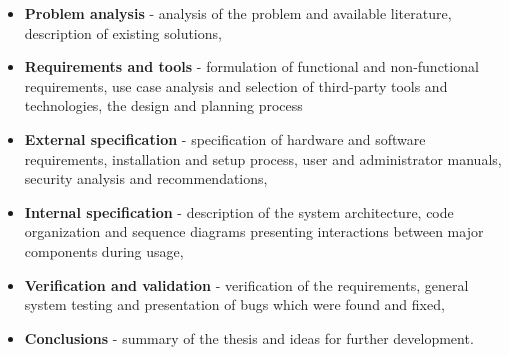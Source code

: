 \begin{itemize}
	\item \textbf{Problem analysis} - analysis of the problem and available literature, description of existing solutions,
	\item \textbf{Requirements and tools} - formulation of functional and non-functional requirements, use case analysis and selection of third-party tools and technologies, the design and planning process
	\item \textbf{External specification} - specification of hardware and software requirements, installation and setup process, user and administrator manuals, security analysis and recommendations,
	\item \textbf{Internal specification} - description of the system architecture, code organization and sequence diagrams presenting interactions between major components during usage,
	\item \textbf{Verification and validation} - verification of the requirements, general system testing and presentation of bugs which were found and fixed,
	\item \textbf{Conclusions} - summary of the thesis and ideas for further development.
\end{itemize}
